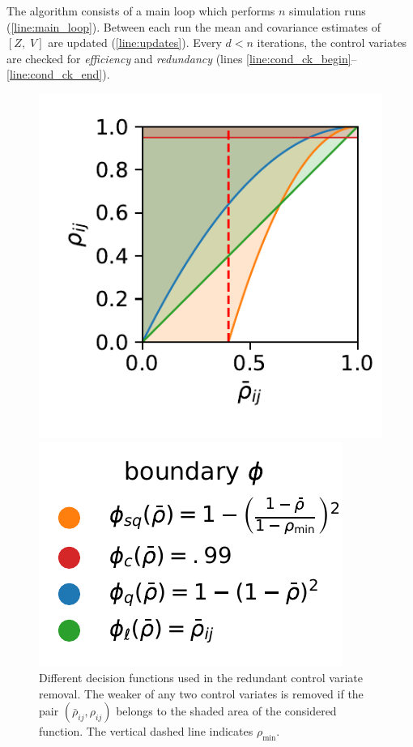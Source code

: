 The algorithm consists of a main loop which performs $n$ simulation runs (\autoref{line:main_loop}).
Between each run the mean and covariance estimates of $[Z,\;  V]$ are updated (\autoref{line:updates}).
Every $d<n$ iterations, the control variates are checked for  \emph{efficiency}
and \emph{redundancy} (lines \ref{line:cond_ck_begin}--\ref{line:cond_ck_end}).

\begin{figure}
    \centering
    \begin{minipage}{.6\textwidth}
    \centering
    \includegraphics[scale=.6]{gfx/decision_funcs.pdf}
    \end{minipage}
    \hspace{-2.8em}
    \begin{minipage}{.3\textwidth}
    \includegraphics[scale=.6]{gfx/legend_1.pdf} \vfill
    \end{minipage}
	\caption[\ac{CV} Redundancy heuristics]{Different decision functions
    used in the redundant control  variate removal. The weaker of any two control  variates is removed if
    the pair $(\bar\rho_{ij}, \rho_{ij})$ belongs to the shaded area of the considered function.
    The vertical dashed line indicates $\rho_{\min}$.\label{fig:decision}}
\end{figure}

